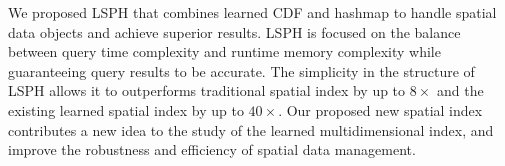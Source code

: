We proposed LSPH that combines learned CDF and hashmap to handle spatial data objects and achieve superior results. LSPH is focused on the balance between query time complexity and runtime memory complexity while guaranteeing query results to be accurate. The simplicity in the structure of LSPH allows it to outperforms traditional spatial index by up to $8\times$ and the existing learned spatial index by up to $40\times$. Our proposed new spatial index contributes a new idea to the study of the learned multidimensional index, and improve the robustness and efficiency of spatial data management. 
